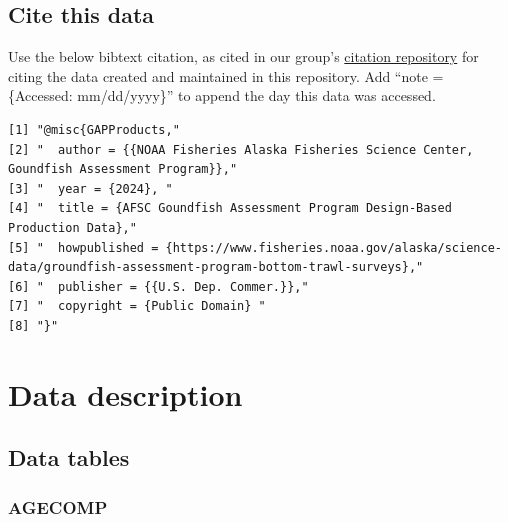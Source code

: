 \documentclass[
  letterpaper,
  oneside,
  open=any]{scrbook}
\begin{document}
\section*{Cite this data}\label{cite-this-data-1}


Use the below bibtext citation, as cited in our group's
\href{https://github.com/afsc-gap-products/citations/blob/main/cite/bibliography.bib}{citation
repository} for citing the data created and maintained in this
repository. Add ``note = \{Accessed: mm/dd/yyyy\}'' to append the day
this data was accessed.

\begin{verbatim}
[1] "@misc{GAPProducts,"                                                                                                       
[2] "  author = {{NOAA Fisheries Alaska Fisheries Science Center, Goundfish Assessment Program}},"                             
[3] "  year = {2024}, "                                                                                                        
[4] "  title = {AFSC Goundfish Assessment Program Design-Based Production Data},"                                              
[5] "  howpublished = {https://www.fisheries.noaa.gov/alaska/science-data/groundfish-assessment-program-bottom-trawl-surveys},"
[6] "  publisher = {{U.S. Dep. Commer.}},"                                                                                     
[7] "  copyright = {Public Domain} "                                                                                           
[8] "}"                                                                                                                        
\end{verbatim}

\chapter{Data description}\label{data-description-1}

\section{Data tables}\label{data-tables}

\subsection{AGECOMP}\label{agecomp}
\end{document}
